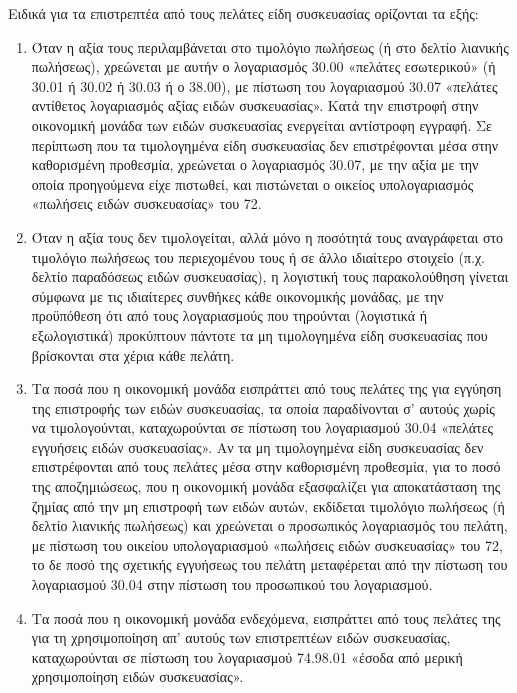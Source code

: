 \documentclass[A4,10pt,greek]{book}
\begin{document}
Ειδικά για τα επιστρεπτέα από τους πελάτες είδη συσκευασίας ορίζονται τα εξής:

\begin{enumerate}


\item Όταν η αξία τους περιλαμβάνεται στο τιμολόγιο πωλήσεως (ή στο δελτίο λιανικής πωλήσεως), χρεώνεται με αυτήν ο λογαριασμός 30.00 «πελάτες εσωτερικού» (ή 30.01 ή 30.02 ή 30.03 ή ο 38.00), με πίστωση του λογαριασμού 30.07 «πελάτες αντίθετος λογαριασμός αξίας ειδών συσκευασίας». Κατά την επιστροφή στην οικονομική μονάδα των ειδών συσκευασίας ενεργείται αντίστροφη εγγραφή. Σε περίπτωση που τα τιμολογημένα είδη συσκευασίας δεν επιστρέφονται μέσα στην καθορισμένη προθεσμία, χρεώνεται ο λογαριασμός 30.07, με την αξία με την οποία προηγούμενα είχε πιστωθεί, και πιστώνεται ο οικείος υπολογαριασμός «πωλήσεις ειδών συσκευασίας» του 72.

\item Όταν η αξία τους δεν τιμολογείται, αλλά μόνο η ποσότητά τους αναγράφεται στο τιμολόγιο πωλήσεως του περιεχομένου τους ή σε άλλο ιδιαίτερο στοιχείο (π.χ. δελτίο παραδόσεως ειδών συσκευασίας), η λογιστική τους παρακολούθηση γίνεται σύμφωνα με τις ιδιαίτερες συνθήκες κάθε οικονομικής μονάδας, με την προϋπόθεση ότι από τους λογαριασμούς που τηρούνται (λογιστικά ή εξωλογιστικά) προκύπτουν πάντοτε τα μη τιμολογημένα είδη συσκευασίας που βρίσκονται στα χέρια κάθε πελάτη.

\item Τα ποσά που η οικονομική μονάδα εισπράττει από τους πελάτες της για εγγύηση της επιστροφής των ειδών συσκευασίας, τα οποία παραδίνονται σ' αυτούς χωρίς να τιμολογούνται, καταχωρούνται σε πίστωση του λογαριασμού 30.04 «πελάτες εγγυήσεις ειδών συσκευασίας». Αν τα μη τιμολογημένα είδη συσκευασίας δεν επιστρέφονται από τους πελάτες μέσα στην καθορισμένη προθεσμία, για το ποσό της αποζημιώσεως, που η οικονομική μονάδα εξασφαλίζει για αποκατάσταση της ζημίας από την μη επιστροφή των ειδών αυτών, εκδίδεται τιμολόγιο πωλήσεως (ή δελτίο λιανικής πωλήσεως) και χρεώνεται ο προσωπικός λογαριασμός του πελάτη, με πίστωση του οικείου υπολογαριασμού «πωλήσεις ειδών συσκευασίας» του 72, το δε ποσό της σχετικής εγγυήσεως του πελάτη μεταφέρεται από την πίστωση του λογαριασμού 30.04 στην πίστωση του προσωπικού του λογαριασμού.

\item Τα ποσά που η οικονομική μονάδα ενδεχόμενα, εισπράττει από τους πελάτες της για τη χρησιμοποίηση απ' αυτούς των επιστρεπτέων ειδών συσκευασίας, καταχωρούνται σε πίστωση του λογαριασμού 74.98.01 «έσοδα από μερική χρησιμοποίηση ειδών συσκευασίας».

\end{enumerate}
\end{document}
